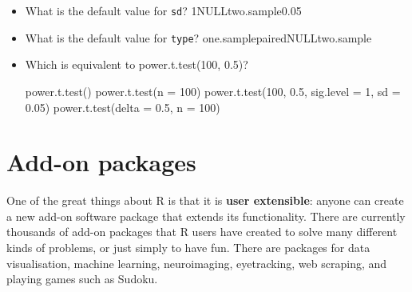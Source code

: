 \documentclass[
  oneside]{book}
\newenvironment{Shaded}{\begin{snugshade}}{\end{snugshade}}
\newcommand{\AttributeTok}[1]{\textcolor[rgb]{0.77,0.63,0.00}{#1}}
\newcommand{\ConstantTok}[1]{\textcolor[rgb]{0.00,0.00,0.00}{#1}}
\newcommand{\DecValTok}[1]{\textcolor[rgb]{0.00,0.00,0.81}{#1}}
\newcommand{\FloatTok}[1]{\textcolor[rgb]{0.00,0.00,0.81}{#1}}
\newcommand{\FunctionTok}[1]{\textcolor[rgb]{0.00,0.00,0.00}{#1}}
\newcommand{\NormalTok}[1]{#1}
\newcommand{\SpecialCharTok}[1]{\textcolor[rgb]{0.00,0.00,0.00}{#1}}
\newcommand{\StringTok}[1]{\textcolor[rgb]{0.31,0.60,0.02}{#1}}
\providecommand{\tightlist}{%
  \setlength{\itemsep}{0pt}\setlength{\parskip}{0pt}}
\begin{document}
\begin{Shaded}
\end{Shaded}

\begin{try}

\begin{itemize}
\tightlist
\item
  What is the default value for \texttt{sd}? 1NULLtwo.sample0.05
\item
  What is the default value for \texttt{type}? one.samplepairedNULLtwo.sample
\item
  Which is equivalent to {power.t.test}{(}{100}, {0.5}{)}?

  \hypertarget{radio_DMJHDVUVPF}{}
  {power.t.test()} {power.t.test(n = 100)} {power.t.test(100, 0.5, sig.level = 1, sd = 0.05)} {power.t.test(delta = 0.5, n = 100)}
\end{itemize}

\end{try}

\hypertarget{install-package}{%
\section{Add-on packages}\label{install-package}}

One of the great things about R is that it is \textbf{user extensible}: anyone can create a new add-on software package that extends its functionality. There are currently thousands of add-on packages that R users have created to solve many different kinds of problems, or just simply to have fun. There are packages for data visualisation, machine learning, neuroimaging, eyetracking, web scraping, and playing games such as Sudoku.
\end{document}
